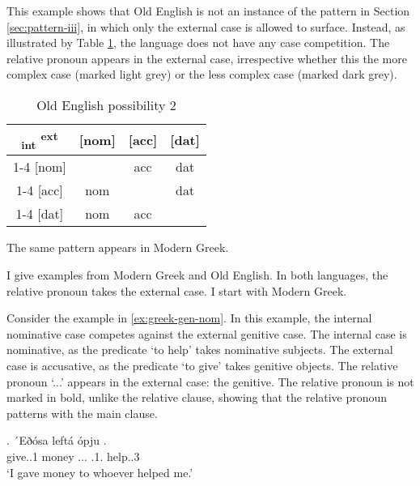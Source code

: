 This example shows that Old English is not an instance of the pattern in Section \ref{sec:pattern-iii}, in which only the external case is allowed to surface. Instead, as illustrated by Table \ref{tbl:no-case-competition-old-english}, the language does not have any case competition. The relative pronoun appears in the external case, irrespective whether this the more complex case (marked light grey) or the less complex case (marked dark grey).

\begin{table}[H]
  \center
  \caption{Old English possibility 2}
  \begin{tabular}{c|c|c|c}
    \toprule
   \textsubscript{\ac{int}} \textsuperscript{\ac{ext}}
          & [\ac{nom}]
          & [\ac{acc}]
          & [\ac{dat}]
          \\ \cmidrule{1-4}
      [\ac{nom}]
          &
          & \ac{acc}
          & \cellcolor{LG}\ac{dat}
          \\ \cmidrule{1-4}
      [\ac{acc}]
          & \ac{nom}
          &
          & \ac{dat}
          \\ \cmidrule{1-4}
      [\ac{dat}]
          & \ac{nom}
          & \cellcolor{DG}\ac{acc}
          &
          \\
    \bottomrule
  \end{tabular}
  \label{tbl:no-case-competition-old-english}
\end{table}




The same pattern appears in Modern Greek.


I give examples from Modern Greek and Old English. In both languages, the relative pronoun takes the external case. I start with Modern Greek.

Consider the example in \ref{ex:greek-gen-nom}. In this example, the internal nominative case competes against the external genitive case.
The internal case is nominative, as the predicate  `to help' takes nominative subjects.
The external case is accusative, as the predicate  `to give' takes genitive objects.
The relative pronoun  `...' appears in the external case: the genitive. The relative pronoun is not marked in bold, unlike the relative clause, showing that the relative pronoun patterns with the main clause.

\exg. ´Eðósa leftá ópju  .\\
give..1 money ... .1. help..3\\
`I gave money to whoever helped me.' \label{ex:greek-gen-nom}

